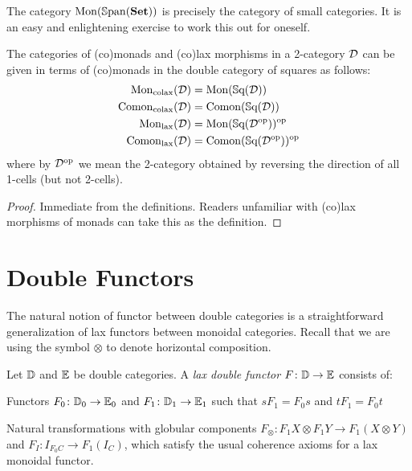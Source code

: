 \begin{example}
	The category $\mathrm{Mon}(\mathbb{S}\mathrm{pan}(\mathbf{Set}))$ is precisely the category of small categories. It is an easy and enlightening exercise to work this out for oneself.
\end{example}

\begin{proposition}
	The categories of (co)monads and (co)lax morphisms in a 2-category $\mathcal{D}$ can be given in terms of (co)monads in the double category of squares as follows:
	\begin{align*}
		\mathrm{Mon}_{\text{colax}}(\mathcal{D}) &= \mathrm{Mon}(\mathbb{S}\mathrm{q}(\mathcal{D})) \\
		\mathrm{Comon}_{\text{colax}}(\mathcal{D}) &= \mathrm{Comon}(\mathbb{S}\mathrm{q}(\mathcal{D})) \\
		\mathrm{Mon}_{\text{lax}}(\mathcal{D}) &= \mathrm{Mon}(\mathbb{S}\mathrm{q}(\mathcal{D}^{\text{op}}))^{\text{op}} \\
		\mathrm{Comon}_{\text{lax}}(\mathcal{D}) &= \mathrm{Comon}(\mathbb{S}\mathrm{q}(\mathcal{D}^{\text{op}}))^{\text{op}}
	\end{align*}
	where by $\mathcal{D}^{\text{op}}$ we mean the 2-category obtained by reversing the direction of all 1-cells (but not 2-cells).
\end{proposition}
\begin{proof}
	Immediate from the definitions. Readers unfamiliar with (co)lax morphisms of monads can take this as the definition.
\end{proof}

\section{Double Functors}

The natural notion of functor between double categories is a straightforward generalization of lax functors between monoidal categories. Recall that we are using the symbol $\otimes$ to denote horizontal composition.

\begin{definition}\label{Def:LaxDblFunc}
	Let $\mathbb{D}$ and $\mathbb{E}$ be double categories. A \emph{lax double functor} $F\colon\mathbb{D}\to\mathbb{E}$ consists of:
	\begin{compactitem}
		\item Functors $F_0\colon\mathbb{D}_0 \to\mathbb{E}_0$ and $F_1\colon\mathbb{D}_1 \to\mathbb{E}_1$ such that $sF_1=F_0s$ and $tF_1=F_0t$
		\item Natural transformations with globular components $F_{\otimes}\colon F_1X\otimes F_1Y\to F_1(X\otimes Y)$ and $F_I\colon I_{F_0C}\to F_1(I_C)$, which satisfy the usual coherence axioms for a lax monoidal functor.
	\end{compactitem}
\end{definition}

